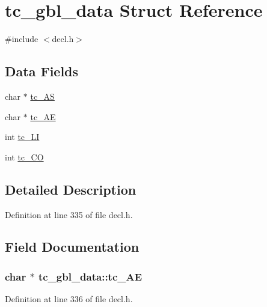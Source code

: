 \hypertarget{structtc__gbl__data}{\section{tc\+\_\+gbl\+\_\+data Struct Reference}
\label{structtc__gbl__data}
}


{\ttfamily \#include $<$decl.\+h$>$}

\subsection*{Data Fields}
\begin{DoxyCompactItemize}
\item 
char $\ast$ \hyperlink{structtc__gbl__data_a0619ae5a4377f7b150b2eb97aedff5ce}{tc\+\_\+\+A\+S}
\item 
char $\ast$ \hyperlink{structtc__gbl__data_add2a6be06bee7c852acc27029b327f9b}{tc\+\_\+\+A\+E}
\item 
int \hyperlink{structtc__gbl__data_a7fd710d18e5b7cc4a90e627abc09fa03}{tc\+\_\+\+L\+I}
\item 
int \hyperlink{structtc__gbl__data_a012cd0f9f623dd5443002082796a37f7}{tc\+\_\+\+C\+O}
\end{DoxyCompactItemize}


\subsection{Detailed Description}


Definition at line 335 of file decl.\+h.



\subsection{Field Documentation}
\hypertarget{structtc__gbl__data_add2a6be06bee7c852acc27029b327f9b}{
\subsubsection[{tc\+\_\+\+A\+E}]{\setlength{\rightskip}{0pt plus 5cm}char $\ast$ tc\+\_\+gbl\+\_\+data\+::tc\+\_\+\+A\+E}}\label{structtc__gbl__data_add2a6be06bee7c852acc27029b327f9b}


Definition at line 336 of file decl.\+h.

